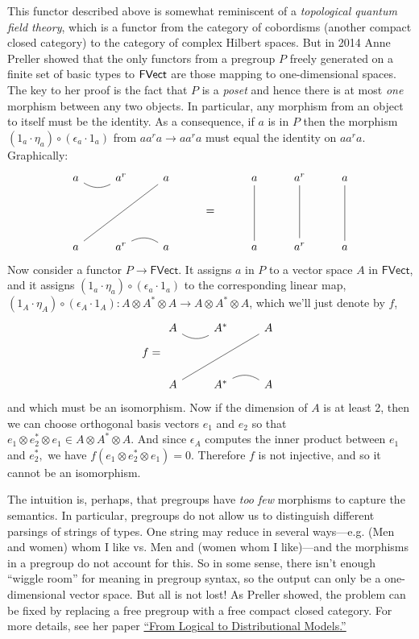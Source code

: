 \documentclass{tufte-handout-tai}
\newcommand{\cat}[1]{{\normalfont\textsf{#1}}}
\theoremstyle{plain}
\theoremstyle{definition}
\theoremstyle{remark}
\begin{document}
This functor described above is somewhat reminiscent of a \textit{topological quantum field theory}, which is a functor from the category of cobordisms (another compact closed category) to the category of complex Hilbert spaces. But in 2014 Anne Preller showed that  the only functors from a pregroup $P$ freely generated on a finite set of basic types to $\cat{FVect}$ are those mapping to one-dimensional spaces.	The key to her proof is the fact that $P$ is a \textit{poset} and hence there is at most \textit{one} morphism between any two objects. In particular, any morphism from an object to itself must be the identity. As a consequence, if $a$ is in $P$ then the morphism $(1_a\cdot \eta_a)\circ(\epsilon_a\cdot 1_a)$ from $a a^r a\to a a^r a$ must equal the identity on $a a^r a$. Graphically:
	\[
	\begin{tikzcd}
	a \arrow[r, no head, bend right] & a^r & a \arrow[lldd, no head] &  & a \arrow[dd, no head] & a^r \arrow[dd, no head] & a \arrow[dd, no head] \\
 	&  &  & = &  &  &  \\
	a & a^r \arrow[r, no head, bend left] & a &  & a & a^r & a
	\end{tikzcd}
	\]
Now consider a functor $P\to \mathsf{FVect}$. It assigns $a$ in $P$ to a vector space $A$ in $\mathsf{FVect}$, and it  assigns $(1_a\cdot \eta_a)\circ(\epsilon_a\cdot 1_a)$ to the corresponding linear map, $(1_A\cdot \eta_A)\circ(\epsilon_A\cdot 1_A)\colon A\otimes A^*\otimes A\to A\otimes A^*\otimes A$, which we'll just denote by $f$,
	\[f =
	\begin{tikzcd}
	A \arrow[r, no head, bend right] & A^* & A \arrow[lldd, no head] \\
 	&  &  \\
	A & A^* \arrow[r, no head, bend left] & A
	\end{tikzcd}
	\] 
and which must be an isomorphism. Now if the dimension of $A$ is at least 2, then we can choose orthogonal basis vectors $e_1$ and $e_2$ so that $e_1\otimes e_2^*\otimes e_1\in A\otimes A^*\otimes A$. And since $\epsilon_A$ computes the inner product between $e_1$ and $e_2^*,$ we have $f(e_1\otimes e_2^*\otimes e_1)=0.$ Therefore $f$ is not injective, and so it cannot be an isomorphism.

The intuition is, perhaps, that pregroups have \textit{too few} morphisms to capture the semantics. In particular, pregroups do not allow us to distinguish different parsings of strings of types. One string may reduce in several ways---e.g. (Men and women) whom I like vs. Men and (women whom I like)---and the morphisms in a pregroup do not account for this. So in some sense, there isn't enough ``wiggle room'' for meaning in pregroup syntax, so the output can only be a one-dimensional vector space. But all is not lost! As Preller showed, the problem can be fixed by replacing a free pregroup with a free compact closed category. For more details, see her paper \href{https://arxiv.org/pdf/1412.8527.pdf}{``From Logical to Distributional Models.''}
\end{document}
